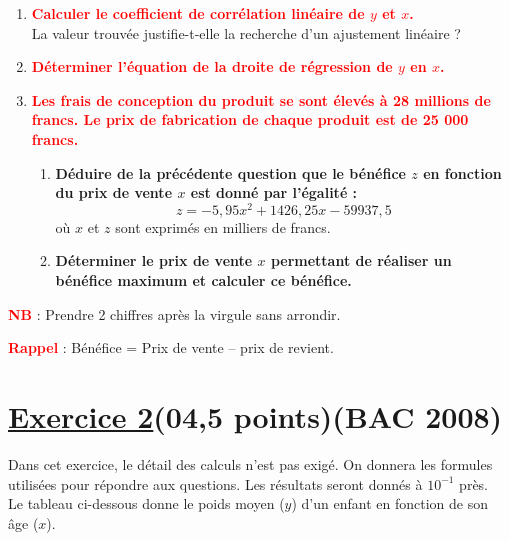 \documentclass[12pt,a4paper]{article}
\begin{document}
\vspace{0.4cm}

\begin{enumerate}
    \item \textbf{\textcolor{red}{Calculer le coefficient de corrélation linéaire de \( y \) et \( x \).}}\\
    La valeur trouvée justifie-t-elle la recherche d’un ajustement linéaire ?

    \item \textbf{\textcolor{red}{Déterminer l’équation de la droite de régression de \( y \) en \( x \).}}

    \item \textbf{\textcolor{red}{Les frais de conception du produit se sont élevés à 28 millions de francs. Le prix de fabrication de chaque produit est de 25 000 francs.}}

    \begin{enumerate}
        \item \textbf{Déduire de la précédente question que le bénéfice \( z \) en fonction du prix de vente \( x \) est donné par l’égalité :}
        \[
        z = -5{,}95x^2 + 1426{,}25x - 59937{,}5
        \]
        où \( x \) et \( z \) sont exprimés en milliers de francs.

        \item \textbf{Déterminer le prix de vente \( x \) permettant de réaliser un bénéfice maximum et calculer ce bénéfice.}
    \end{enumerate}
\end{enumerate}

\vspace{0.4cm}
\textcolor{red}{\textbf{NB}} : Prendre 2 chiffres après la virgule sans arrondir.

\vspace{0.2cm}
\textcolor{red}{\textbf{Rappel}} : Bénéfice = Prix de vente – prix de revient.
\section*{\underline{Exercice 2}(04,5 points)(BAC 2008)}

Dans cet exercice, le détail des calculs n’est pas exigé. On donnera les formules utilisées pour répondre aux questions. Les résultats seront donnés à \( 10^{-1} \) près.\\
Le tableau ci-dessous donne le poids moyen (\( y \)) d’un enfant en fonction de son âge (\( x \)).

\vspace{0.3cm}
\end{document}

